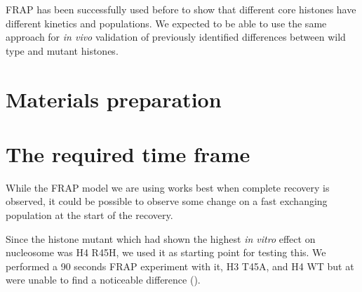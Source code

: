   FRAP has been successfully used before to show that different core histones have
  different kinetics and populations. We expected to be able to use the same approach
  for \textit{in vivo} validation of previously identified differences between
  wild type and mutant histones.



\section{Materials preparation}

\section{The required time frame}
  
  While the FRAP model we are using works best when complete recovery is observed, it could be
  possible to observe some change on a fast exchanging population at the start of the recovery.
  
  Since the histone mutant which had shown the highest \textit{in vitro} effect on nucleosome
  was H4 R45H, we used it as starting point for testing this. We performed a 90 seconds FRAP
  experiment with it, H3 T45A, and H4 WT but at were unable to find a noticeable difference
  ().
  
  \begin{figure}
    \centering
                 {}
    \label{fig:90-sec-frap}
  \end{figure}
  
